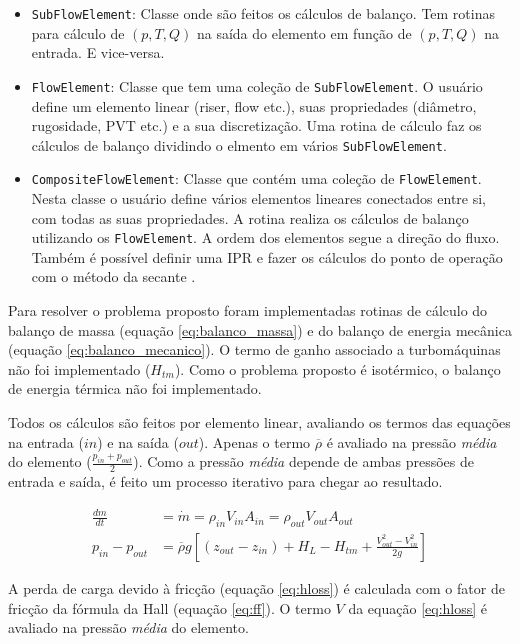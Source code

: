 \documentclass[final,3p]{elsarticle}
\numberwithin{equation}{section}
\begin{document}
        \begin{itemize}
          \item \texttt{SubFlowElement}: Classe onde são feitos os cálculos de balanço. Tem rotinas para cálculo de $(p,T,Q)$ na saída do elemento em função de $(p,T,Q)$ na entrada. E vice-versa.
          \item \texttt{FlowElement}: Classe que tem uma coleção de \texttt{SubFlowElement}. O usuário define um elemento linear (riser, flow etc.), suas propriedades (diâmetro, rugosidade, PVT etc.) e a sua discretização. Uma rotina de cálculo faz os cálculos de balanço dividindo o elmento em vários \texttt{SubFlowElement}.
          \item \texttt{CompositeFlowElement}: Classe que contém uma coleção de \texttt{FlowElement}. Nesta classe o usuário define vários elementos lineares conectados entre si, com todas as suas propriedades. A rotina realiza os cálculos de balanço utilizando os \texttt{FlowElement}. A ordem dos elementos segue a direção do fluxo. Também é possível definir uma IPR e fazer os cálculos do ponto de operação com o método da secante \cite{burden2016analise}.
        \end{itemize}

        Para resolver o problema proposto foram implementadas rotinas de cálculo do balanço de massa (equação \ref{eq:balanco_massa}) e do balanço de energia mecânica (equação \ref{eq:balanco_mecanico}). O termo de ganho associado a turbomáquinas não foi implementado ($H_{tm}$). Como o problema proposto é isotérmico, o balanço de energia térmica não foi implementado.

        Todos os cálculos são feitos por elemento linear, avaliando os termos das equações na entrada ($in$) e na saída ($out$). Apenas o termo $\overline{\rho}$ é avaliado na pressão \emph{média} do elemento ($\frac{p_{in}+p_{out}}{2}$). Como a pressão \emph{média} depende de ambas pressões de entrada e saída, é feito um processo iterativo para chegar ao resultado.

        \begin{align}
          \frac{dm}{dt} &= \dot{m}  = \rho_{in} V_{in} A_{in} = \rho_{out} V_{out} A_{out} \label{eq:balanco_massa} \\
          p_{in} - p_{out} &= \overline{\rho} g \left[ (z_{out} - z_{in}) + H_L - H_{tm} + \frac{V_{out}^2 - V_{in}^2}{2g} \right] \label{eq:balanco_mecanico}
        \end{align}

        A perda de carga devido à fricção (equação \ref{eq:hloss}) é calculada com o fator de fricção da fórmula da Hall (equação \ref{eq:ff}). O termo $V$ da equação \ref{eq:hloss} é avaliado na pressão \emph{média} do elemento.
\end{document}

